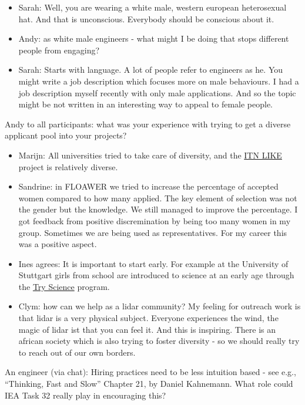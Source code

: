 \begin{itemize}
	\item Sarah: Well, you are wearing a white male, western european heterosexual hat. And that is unconscious. Everybody should be conscious about it.
	\item Andy: as white male engineers - what might I be doing that stops different people from engaging?
	\item Sarah: Starts with language. A lot of people refer to engineers as he. You might write a job description which focuses more on male behaviours. I had a job description myself recently with only male applications. And so the topic might be not written in an interesting way to appeal to female people.
\end{itemize}

Andy to all participants: what was your experience with trying to get a diverse applicant pool into your projects?

\begin{itemize}
	\item Marijn: All universities tried to take care of diversity, and the \href{https://www.msca-like.eu/}{ITN LIKE} project is relatively diverse.
	\item Sandrine: in FLOAWER we tried to increase the percentage of accepted women compared to how many applied. The key element of selection was not the gender but the knowledge. We still managed to improve the percentage. I got feedback from positive discremination by being too many women in my group. Sometimes we are being used as representatives. For my career this was a positive aspect.
	\item Ines agrees: It is important to start early. For example at the University of Stuttgart girls from school are introduced to science at an early age through the \href{https://www.uni-stuttgart.de/studium/orientierung/try-science/}{Try Science} program.
	\item Clym: how can we help as a lidar community? My feeling for outreach work is that lidar is a very physical subject. Everyone experiences the wind, the magic of lidar ist that you can feel it. And this is inspiring. There is an african society which is also trying to foster diversity - so we should really try to reach out of our own borders.
\end{itemize}

An engineer (via chat): Hiring practices need to be less intuition based - see e.g., \enquote{Thinking, Fast and Slow} Chapter 21, by Daniel Kahnemann\cite{kahneman2011thinking}. What role could IEA Task 32 really play in encouraging this?

